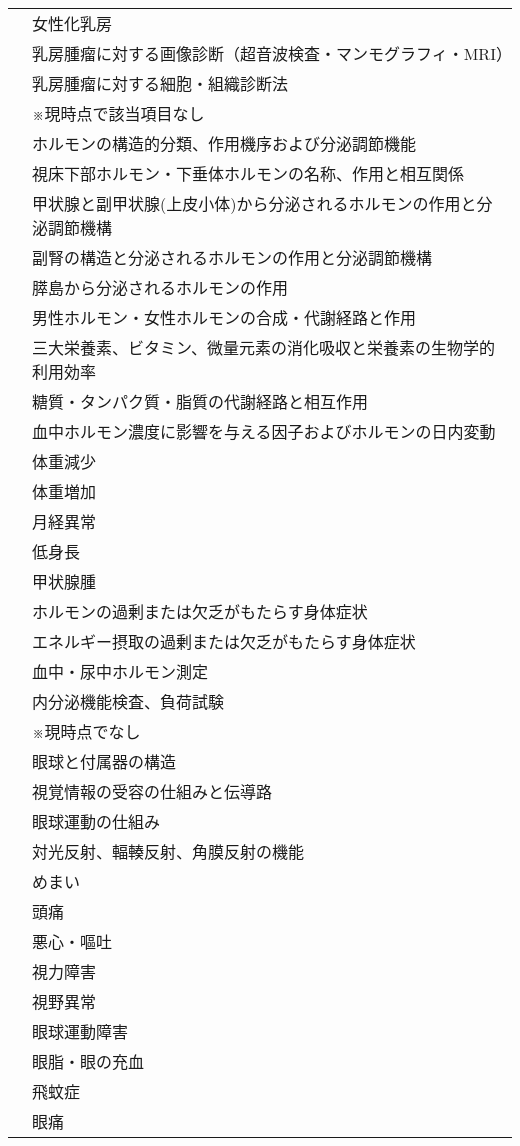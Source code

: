 \begin{xltabular}{\linewidth}{XX}
 & 女性化乳房 \\
 & 乳房腫瘤に対する画像診断（超音波検査・マンモグラフィ・MRI） \\
 & 乳房腫瘤に対する細胞・組織診断法 \\
 & ※現時点で該当項目なし \\
 & ホルモンの構造的分類、作用機序および分泌調節機能 \\
 & 視床下部ホルモン・下垂体ホルモンの名称、作用と相互関係 \\
 & 甲状腺と副甲状腺(上皮小体)から分泌されるホルモンの作用と分泌調節機構 \\
 & 副腎の構造と分泌されるホルモンの作用と分泌調節機構 \\
 & 膵島から分泌されるホルモンの作用 \\
 & 男性ホルモン・女性ホルモンの合成・代謝経路と作用 \\
 & 三大栄養素、ビタミン、微量元素の消化吸収と栄養素の生物学的利用効率 \\
 & 糖質・タンパク質・脂質の代謝経路と相互作用 \\
 & 血中ホルモン濃度に影響を与える因子およびホルモンの日内変動 \\
 & 体重減少 \\
 & 体重増加 \\
 & 月経異常 \\
 & 低身長 \\
 & 甲状腺腫 \\
 & ホルモンの過剰または欠乏がもたらす身体症状 \\
 & エネルギー摂取の過剰または欠乏がもたらす身体症状 \\
 & 血中・尿中ホルモン測定 \\
 & 内分泌機能検査、負荷試験 \\
 & ※現時点でなし \\
 & 眼球と付属器の構造 \\
 & 視覚情報の受容の仕組みと伝導路 \\
 & 眼球運動の仕組み \\
 & 対光反射、輻輳反射、角膜反射の機能 \\
 & めまい \\
 & 頭痛 \\
 & 悪心・嘔吐 \\
 & 視力障害 \\
 & 視野異常 \\
 & 眼球運動障害 \\
 & 眼脂・眼の充血 \\
 & 飛蚊症 \\
 & 眼痛 \\

\end{xltabular}
